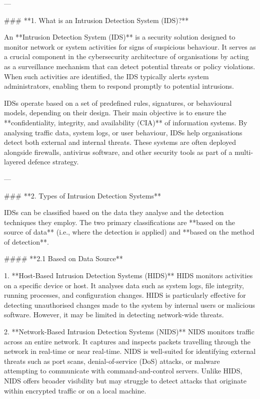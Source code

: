 ---

### **1. What is an Intrusion Detection System (IDS)?**

An **Intrusion Detection System (IDS)** is a security solution designed to monitor network or system activities for signs of suspicious behaviour. It serves as a crucial component in the cybersecurity architecture of organisations by acting as a surveillance mechanism that can detect potential threats or policy violations. When such activities are identified, the IDS typically alerts system administrators, enabling them to respond promptly to potential intrusions.

IDSs operate based on a set of predefined rules, signatures, or behavioural models, depending on their design. Their main objective is to ensure the **confidentiality, integrity, and availability (CIA)** of information systems. By analysing traffic data, system logs, or user behaviour, IDSs help organisations detect both external and internal threats. These systems are often deployed alongside firewalls, antivirus software, and other security tools as part of a multi-layered defence strategy.

---

### **2. Types of Intrusion Detection Systems**

IDSs can be classified based on the data they analyse and the detection techniques they employ. The two primary classifications are **based on the source of data** (i.e., where the detection is applied) and **based on the method of detection**.

#### **2.1 Based on Data Source**

1. **Host-Based Intrusion Detection Systems (HIDS)**
   HIDS monitors activities on a specific device or host. It analyses data such as system logs, file integrity, running processes, and configuration changes. HIDS is particularly effective for detecting unauthorised changes made to the system by internal users or malicious software. However, it may be limited in detecting network-wide threats.

2. **Network-Based Intrusion Detection Systems (NIDS)**
   NIDS monitors traffic across an entire network. It captures and inspects packets travelling through the network in real-time or near real-time. NIDS is well-suited for identifying external threats such as port scans, denial-of-service (DoS) attacks, or malware attempting to communicate with command-and-control servers. Unlike HIDS, NIDS offers broader visibility but may struggle to detect attacks that originate within encrypted traffic or on a local machine.

